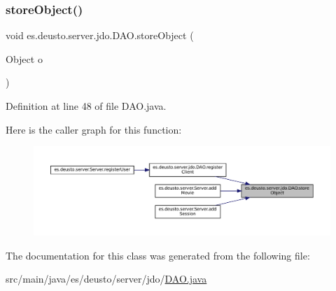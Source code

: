 \subsubsection{\texorpdfstring{storeObject()}{storeObject()}}
{\footnotesize\ttfamily void es.\+deusto.\+server.\+jdo.\+D\+A\+O.\+store\+Object (\begin{DoxyParamCaption}\item[{Object}]{o }\end{DoxyParamCaption})}



Definition at line 48 of file D\+A\+O.\+java.

Here is the caller graph for this function\+:
\nopagebreak
\begin{figure}[H]
\begin{center}
\leavevmode
\includegraphics[width=350pt]{classes_1_1deusto_1_1server_1_1jdo_1_1_d_a_o_a663255898c034b46536c8a9cd2b247f9_icgraph}
\end{center}
\end{figure}


The documentation for this class was generated from the following file\+:\begin{DoxyCompactItemize}
\item 
src/main/java/es/deusto/server/jdo/\mbox{\hyperlink{_d_a_o_8java}{D\+A\+O.\+java}}\end{DoxyCompactItemize}
